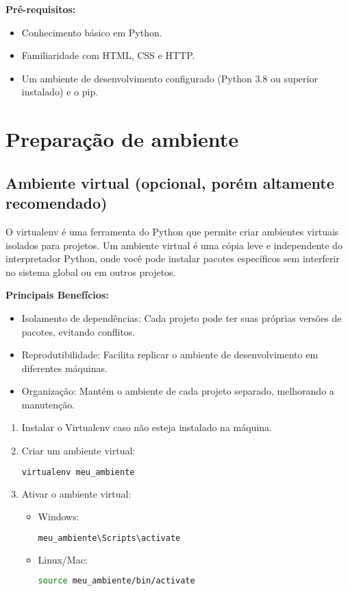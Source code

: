 \textbf{Pr\'e-requisitos:}
\begin{itemize}
    \item Conhecimento b\'asico em Python.
    \item Familiaridade com HTML, CSS e HTTP.
    \item Um ambiente de desenvolvimento configurado (Python 3.8 ou superior instalado) e o pip.
\end{itemize}

\section{Prepara\c{c}\~ao de ambiente}

\subsection*{Ambiente virtual (opcional, por\'em altamente recomendado)}
O virtualenv \'{e} uma ferramenta do Python que permite criar ambientes virtuais isolados para projetos. Um ambiente virtual \'{e} uma c\'opia leve e independente do interpretador Python, onde voc\^{e} pode instalar pacotes espec\'{i}ficos sem interferir no sistema global ou em outros projetos.

\textbf{Principais Benef\'icios:}
\begin{itemize}
    \item Isolamento de depend\^{e}ncias: Cada projeto pode ter suas pr\'oprias vers\~oes de pacotes, evitando conflitos.
    \item Reprodutibilidade: Facilita replicar o ambiente de desenvolvimento em diferentes m\'aquinas.
    \item Organiza\c{c}\~ao: Mant\'em o ambiente de cada projeto separado, melhorando a manuten\c{c}\~ao.
\end{itemize}

\begin{enumerate}
    \item Instalar o Virtualenv caso n\~ao esteja instalado na m\'aquina.
    \item Criar um ambiente virtual:

\begin{lstlisting}[language=bash]
virtualenv meu_ambiente
\end{lstlisting}

    \item Ativar o ambiente virtual:
    \begin{itemize}
      \item Windows:
\begin{lstlisting}[language=bash]
meu_ambiente\Scripts\activate
\end{lstlisting}
      \item Linux/Mac:
\begin{lstlisting}[language=bash]
source meu_ambiente/bin/activate
\end{lstlisting}
    \end{itemize}
\end{enumerate}

